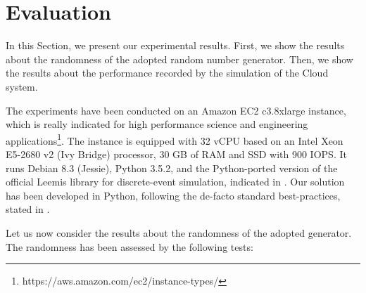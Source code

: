 \section{Evaluation}
\label{sec:evaluation}

In this Section, we present our experimental results.
First, we show the results about the randomness of the adopted random number generator.
Then, we show the results about the performance recorded by the simulation of the Cloud system.

The experiments have been conducted on an Amazon EC2 c3.8xlarge instance, which is really indicated for high performance science and engineering applications\footnote{https://aws.amazon.com/ec2/instance-types/}.
The instance is equipped with 32 vCPU based on an Intel Xeon E5-2680 v2 (Ivy Bridge) processor, 30 GB of RAM and SSD with 900 IOPS.
It runs Debian 8.3 (Jessie), Python 3.5.2, and the Python-ported version of the official Leemis library for discrete-event simulation, indicated in \cite{leemis2006discrete}.
Our solution has been developed in Python, following the de-facto standard best-practices, stated in \cite{reitz2016,GooglePythonStyleguide}.

Let us now consider the results about the randomness of the adopted generator.
The randomness has been assessed by the following tests:

